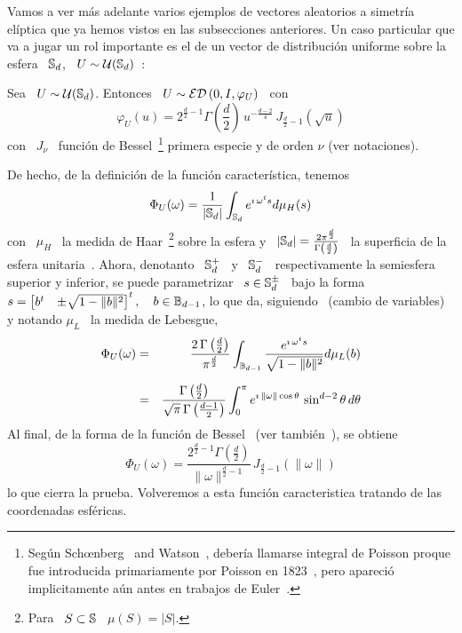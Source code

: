 Vamos a ver  m\'as adelante varios ejemplos de  vectores aleatorios a simetr\'ia
el\'iptica  que  ya  hemos  vistos  en las  subsecciones  anteriores.   Un  caso
particular que va a jugar un rol importante es el de un vector de distribuci\'on
uniforme sobre la esfera \ $\mathbb{S}_d$, \ $U \sim \mathcal{U}(\mathbb{S}_d)$~\cite{FanKot90}:
%
\begin{ejemplo}
\label{Ej:MP:GeneCaracUniformeEsfera}
%
  Sea \  $U \sim \mathcal{U}(\mathbb{S}_d)$. Entonces  \ $U \sim  \mathcal{ED}\left( 0 , I  , \varphi_U
  \right)$ \ con
  \[
  \varphi_U(u)   =  2^{\frac{d}{2}-1}   \Gamma\left(   \frac{d}{2}  \right)   \,
  u^{-\frac{d-2}{4}} \, J_{\frac{d}{2}-1}\left( \sqrt{u} \right)
  \]
  con \ $J_\nu$ \ funci\'on de Bessel~\footnote{Seg\'un Sch{\oe}nberg~\cite[Nota
    de  pie~9]{Sch38} and Watson~\cite[p.~24,  nota de  pie~*]{Wat22}, deber\'ia
    llamarse  integral  de  Poisson  proque fue  introducida  primariamente  por
    Poisson en 1823~\cite{Poi23}, pero  apareci\'o implicitamente a\'un antes en
    trabajos  de Euler~\cite[Cap.~X, \S~1036]{Eul1769}.}   primera especie  y de
  orden $\nu$ (ver notaciones).
  
  De hecho, de la definici\'on de la funci\'on caracter\'istica, tenemos
  \[
  \Phi_U(\omega) =  \frac{1}{|\mathbb{S}_d|} \int_{\mathbb{S}_d} e^{\imath  \, \omega^t s}
  d\mu_H(s)
  \]
  con \ $\mu_H$ \ la medida de Haar~\footnote{Para \ $S \subset \mathbb{S}$ \ $\mu(S)
    =    |S|$.}     sobre    la    esfera    y   \    $|\mathbb{S}_d|    =    \frac{2
    \pi^{\frac{d}{2}}}{\Gamma\left( \frac{d}{2} \right)}$  \ la superficia de la
  esfera  unitaria~\cite{GraRyz15}.   Ahora,  denotanto  \  $\mathbb{S}_d^+$  \  y  \
  $\mathbb{S}_d^-$  \ respectivamente  la semiesfera  superior y  inferior,  se puede
  parametrizar \  $s \in \mathbb{S}_d^{\pm}$ \  bajo la forma \  $s = \begin{bmatrix}
    b^t & \pm \sqrt{1-\|b\|^2} \end{bmatrix}^t, \quad b \in \mathbb{B}_{d-1}$, lo que
  da,  siguiendo~\cite[ec.~4.644]{GraRyz15}  (cambio  de  variables)  y  notando
  $\mu_L$ \ la medida de Lebesgue,
  \begin{eqnarray*}
  \Phi_U(\omega) & = & \frac{2 \, \Gamma\left( \frac{d}{2}
  \right)}{\pi^{\frac{d}{2}}} \int_{\mathbb{B}_{d-1}} \frac{e^{\imath \, \omega^t
  s}}{\sqrt{1-\|b\|^2}} d\mu_L(b)\\[2mm]
  & = & \frac{\Gamma\left( \frac{d}{2} \right)}{\sqrt{\pi} \, \Gamma\left(
  \frac{d-1}{2} \right)} \int_0^{\pi} e^{\imath \, \| \omega \| \cos\theta} \,
  \sin^{d-2}\theta \, d\theta
  \end{eqnarray*}
  Al final,  de la forma de la  funci\'on de Bessel~\cite[Ec.~8.411-7]{GraRyz15}
  (ver tambi\'en~\cite{AbrSte70, Wat22, GraMat95}), se obtiene
  \[
  \Phi_U(\omega) =  \frac{2^{\frac{d}{2}-1} \Gamma\left( \frac{d}{2} \right)}{\|
    \omega \|^{\frac{d}{2}-1}} \, J_{\frac{d}{2}-1}\left( \|\omega\| \right)
  \]
  lo que cierra  la prueba. Volveremos a esta  funci\'on caracteristica tratando
  de las coordenadas esf\'ericas.
\end{ejemplo}

